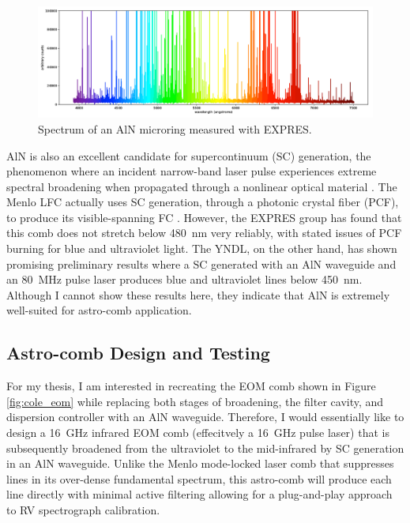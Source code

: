 \documentclass[11pt]{article}
\begin{document}
\begin{figure}
    \centering
    \includegraphics[width=\textwidth]{images/aln_spectrum.png}
    \caption{Spectrum of an AlN microring measured with EXPRES.}
    \label{fig:aln_spectrum}
\end{figure}

AlN is also an excellent candidate for supercontinuum (SC) generation, the phenomenon where an incident narrow-band laser pulse experiences extreme spectral broadening when propagated through a nonlinear optical material \citep{Dudley2006}. The Menlo LFC actually uses SC generation, through a photonic crystal fiber (PCF), to produce its visible-spanning FC \citep{Probst2014}. However, the EXPRES group has found that this comb does not stretch below \SI{480}{\nano\meter} very reliably, with stated issues of PCF burning for blue and ultraviolet light. The YNDL, on the other hand, has shown promising preliminary results where a SC generated with an AlN waveguide and an \SI{80}{\mega\hertz} pulse laser produces blue and ultraviolet lines below \SI{450}{\nano\meter}. Although I cannot show these results here, they indicate that AlN is extremely well-suited for astro-comb application.

\subsection{Astro-comb Design and Testing}
\label{subsec:comb_design}

For my thesis, I am interested in recreating the EOM comb shown in Figure \ref{fig:cole_eom} while replacing both stages of broadening, the filter cavity, and dispersion controller with an AlN waveguide. Therefore, I would essentially like to design a \SI{16}{\giga\hertz} infrared EOM comb (effecitvely a \SI{16}{\giga\hertz} pulse laser) that is subsequently broadened from the ultraviolet to the mid-infrared by SC generation in an AlN waveguide. Unlike the Menlo mode-locked laser comb that suppresses lines in its over-dense fundamental spectrum, this astro-comb will produce each line directly with minimal active filtering allowing for a plug-and-play approach to RV spectrograph calibration.
\end{document}
